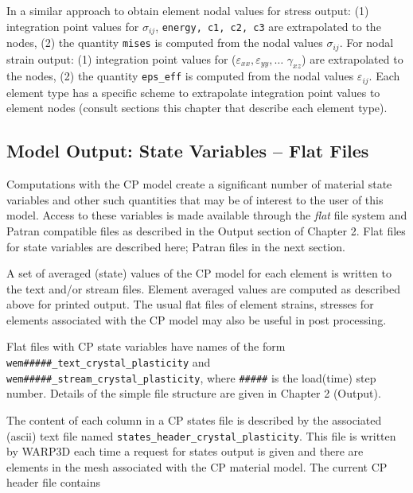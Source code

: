 \documentclass[11pt]{report}
\numberwithin{equation}{section}
\newcommand{\ttt} {\texttt}  %
\newcommand{\ti}{\emph}
\newcommand{\veps}{\varepsilon}
\begin{document}
In a similar approach to obtain element nodal values for stress output: (1) integration point values for
$\sigma_{ij}$, \ttt{energy, c1, c2, c3} are extrapolated to the nodes, (2) the quantity \ttt{mises} is
computed from the nodal values $\sigma_{ij}$. For nodal  strain output: (1) integration point values for
($\veps_{xx}, \veps_{yy}, \dots $ $\gamma_{xz}$)
 are extrapolated to the nodes, (2) the quantity \ttt{eps\_eff} is
computed from the nodal values $\veps_{ij}$. Each element type has a specific scheme
to extrapolate integration point values to element nodes (consult sections this chapter that
describe each element type). 


\subsection{Model Output: State Variables -- Flat Files}
Computations with the CP model create a significant number of material state variables and other
such quantities that may be of interest to the user of this model.
Access to these variables is made available through the \ti{flat} file system and Patran compatible
files as described
in the Output section of Chapter 2. Flat files for state variables are described here;
Patran files in the next section.

A set of averaged (state) values of the CP model for
each element is written to 
the text and/or stream files. Element averaged values are computed as described
above for printed output. The usual flat files of element strains, stresses for elements associated
with the CP model may also be useful in post processing.

Flat files with CP state variables have names of the form \small{\ttt{ wem\#\#\#\#\#\_text\_crystal\_plasticity}}
\normalsize and  \small{\ttt{ wem\#\#\#\#\#\_stream\_crystal\_plasticity}}, \normalsize 
where \verb|#####| is the load(time) step number.
Details of the simple file structure are given in Chapter 2 (Output).

The content of each column in a CP states file is described by the associated (ascii) text file named  
\small{\ttt{states\_header\_crystal\_plasticity}}\normalsize. This file is written by
WARP3D each time a request for states output is given and there are elements in the
mesh associated with the CP material model.  The current CP header file contains
\end{document}
